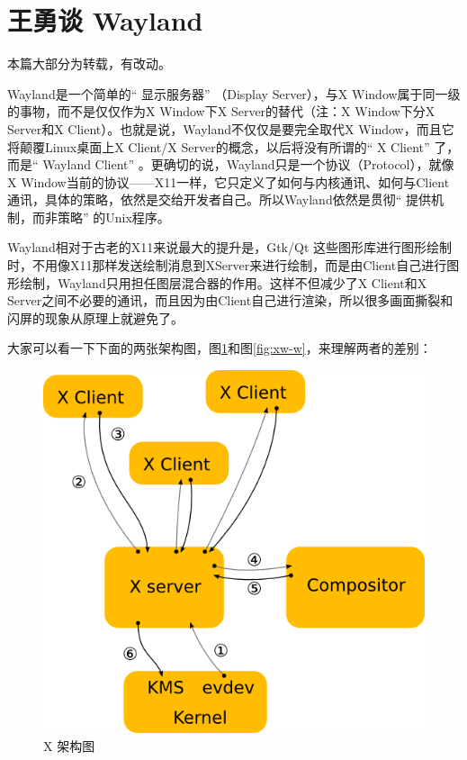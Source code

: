 \documentclass[doctor,openright,twoside]{sjtuthesis}
\theoremstyle{plain}
\theoremstyle{definition}
\theoremstyle{remark}
\theoremstyle{ocrenumbox}
\theoremstyle{plain}
\begin{document}
\hypertarget{wayland}{%
\section{王勇谈 Wayland}\label{wayland}}

本篇大部分为转载，有改动。

Wayland是一个简单的`` 显示服务器'' （Display Server），与X Window属于同一级的事物，而不是仅仅作为X Window下X Server的替代（注：X Window下分X Server和X Client）。也就是说，Wayland不仅仅是要完全取代X Window，而且它将颠覆Linux桌面上X Client/X Server的概念，以后将没有所谓的`` X Client'' 了，而是`` Wayland Client'' 。更确切的说，Wayland只是一个协议（Protocol），就像X Window当前的协议------X11一样，它只定义了如何与内核通讯、如何与Client通讯，具体的策略，依然是交给开发者自己。所以Wayland依然是贯彻`` 提供机制，而非策略'' 的Unix程序。

Wayland相对于古老的X11来说最大的提升是，Gtk/Qt 这些图形库进行图形绘制时，不用像X11那样发送绘制消息到XServer来进行绘制，而是由Client自己进行图形绘制，Wayland只用担任图层混合器的作用。这样不但减少了X Client和X Server之间不必要的通讯，而且因为由Client自己进行渲染，所以很多画面撕裂和闪屏的现象从原理上就避免了。

大家可以看一下下面的两张架构图，图\ref{fig:xw-x}和图\ref{fig:xw-w}，来理解两者的差别：

\begin{figure}
\includegraphics{X-architecture} \caption[X 架构图]{X 架构图}\label{fig:xw-x}
\end{figure}
\end{document}

